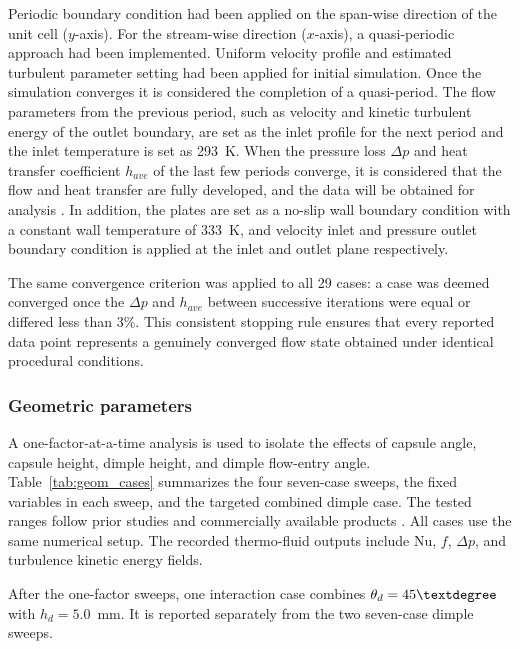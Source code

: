 \documentclass[energies,article,submit,moreauthors,noheaderline]{Definitions/mdpi}
\newcommand{\degree}{\texorpdfstring{\ensuremath{^\circ}}{\textdegree}}
\def\ensuremath#1{}%
\def\degree{\textdegree}%
\begin{document}
 Periodic boundary condition had been applied on the span-wise direction of the unit cell ($y$-axis). For the stream-wise direction ($x$-axis), a quasi-periodic approach had been implemented. Uniform velocity profile and estimated turbulent parameter setting had been applied for initial simulation. Once the simulation converges it is considered the completion of a quasi-period. The flow parameters from the previous period, such as velocity and kinetic turbulent energy of the outlet boundary, are set as the inlet profile for the next period and the inlet temperature is set as 293~K. When the pressure loss $\Delta p$ and heat transfer coefficient $h_{ave}$ of the last few periods converge, it is considered that the flow and heat transfer are fully developed, and the data will be obtained for analysis \citep{jiang2019,jiang2020,zhang2016}. In addition, the plates are set as a no-slip wall boundary condition with a constant wall temperature of 333~K, and velocity inlet and pressure outlet boundary condition is applied at the inlet and outlet plane respectively.

The same convergence criterion was applied to all 29 cases: a case was deemed converged once the $\Delta p$ and $h_{ave}$ between successive iterations were equal or differed less than 3$\%$. This consistent stopping rule ensures that every reported data point represents a genuinely converged flow state obtained under identical procedural conditions.

\subsubsection{Geometric parameters}
\label{sec:geometric_parameters}

A one-factor-at-a-time analysis is used to isolate the effects of capsule angle, capsule height, dimple height, and dimple flow-entry angle. Table~\ref{tab:geom_cases} summarizes the four seven-case sweeps, the fixed variables in each sweep, and the targeted combined dimple case. The tested ranges follow prior studies and commercially available products \citep{hamedi2024, jiang2019, jiang2019a, jiang2020, soman2019, mocnik2024, jing2019, Alfalaval2022}. All cases use the same numerical setup. The recorded thermo-fluid outputs include Nu, $f$, $\Delta p$, and turbulence kinetic energy fields.

After the one-factor sweeps, one interaction case combines $\theta_d=45\degree$ with $h_d=5.0$~mm. It is reported separately from the two seven-case dimple sweeps.
\end{document}
